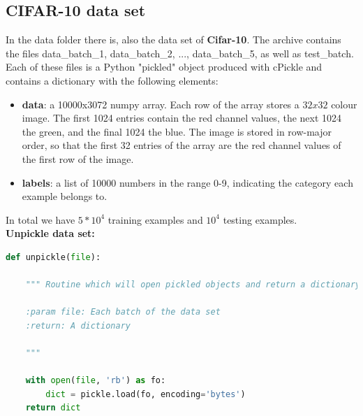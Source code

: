 \documentclass[11pt]{article}
\begin{document}
\subsection{CIFAR-10 data set}

In the data folder there is, also the data set of \textbf{Cifar-10}. The archive contains the files data\_batch\_1, data\_batch\_2, ..., data\_batch\_5, as well as test\_batch. Each of these files is a Python "pickled" object produced with cPickle and contains a dictionary with the following elements:

\begin{itemize}
\item \textbf{data}: a 10000x3072 numpy array. Each row of the array stores a $32x32$ colour image. The first 1024 entries contain the red channel values, the next 1024 the green, and the final 1024 the blue. The image is stored in row-major order, so that the first 32 entries of the array are the red channel values of the first row of the image.
\item \textbf{labels}: a list of 10000 numbers in the range 0-9, indicating the category each example belongs to.
\end{itemize} 

\noindent In total we have $5*10^4$ training examples and $10^4$ testing examples. \\


\noindent \textbf{Unpickle data set:}

\begin{lstlisting}[language = Python]
def unpickle(file):
    
    """ Routine which will open pickled objects and return a dictionary.
    
    :param file: Each batch of the data set
    :return: A dictionary
    
    """
    
    with open(file, 'rb') as fo:
        dict = pickle.load(fo, encoding='bytes')
    return dict
\end{lstlisting}
\end{document}
